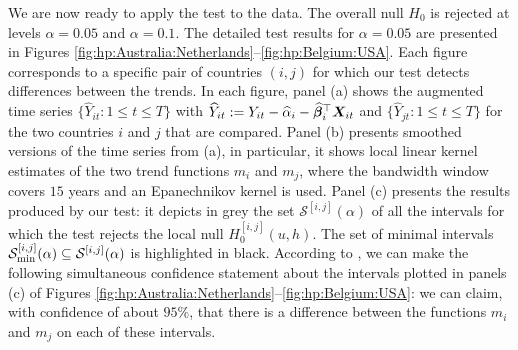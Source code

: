 \documentclass[12pt]{article}
\makeatletter
\renewcommand{\eqref}[1]{\tagform@{\ref{#1}}}
\makeatother
\begin{document}
We are now ready to apply the test to the data. The overall null $H_0$ is rejected at levels $\alpha = 0.05$ and $\alpha = 0.1$. The detailed test results for $\alpha =0.05$ are presented in Figures \ref{fig:hp:Australia:Netherlands}--\ref{fig:hp:Belgium:USA}. 
Each figure corresponds to a specific pair of countries $(i, j)$ for which our test detects differences between the trends. 
In each figure, panel (a) shows the augmented time series $\{\widehat{Y}_{it}: 1 \le t \le T\}$ with $\widehat{Y}_{it} := Y_{it} -\widehat{\alpha}_i - \widehat{\bm{\beta}}_i^\top \boldsymbol{X}_{it}$ and $\{\widehat{Y}_{jt}: 1 \le t \le T\}$ for the two countries $i$ and $j$ that are compared. 
Panel (b) presents smoothed versions of the time series from (a), in particular, it shows local linear kernel estimates of the two trend functions $m_i$ and $m_j$, where the bandwidth window covers $15$ years and an Epanechnikov kernel is used.
Panel (c) presents the results produced by our test: 
it depicts in grey the set $\mathcal{S}^{[i, j]}(\alpha)$ of all the intervals for which the test rejects the local null $H_0^{[i, j]}(u, h)$. The set of minimal intervals $\mathcal{S}^{[i, j]}_{\textnormal{min}}(\alpha) \subseteq \mathcal{S}^{[i, j]}(\alpha)$ is highlighted in black. According to \eqref{eq:CS-v2}, we can make the following simultaneous confidence statement about the intervals plotted in panels (c) of Figures \ref{fig:hp:Australia:Netherlands}--\ref{fig:hp:Belgium:USA}: we can claim, with confidence of about $95\%$, that there is a difference between the functions $m_i$ and $m_j$ on each of these intervals. 


\end{document}
